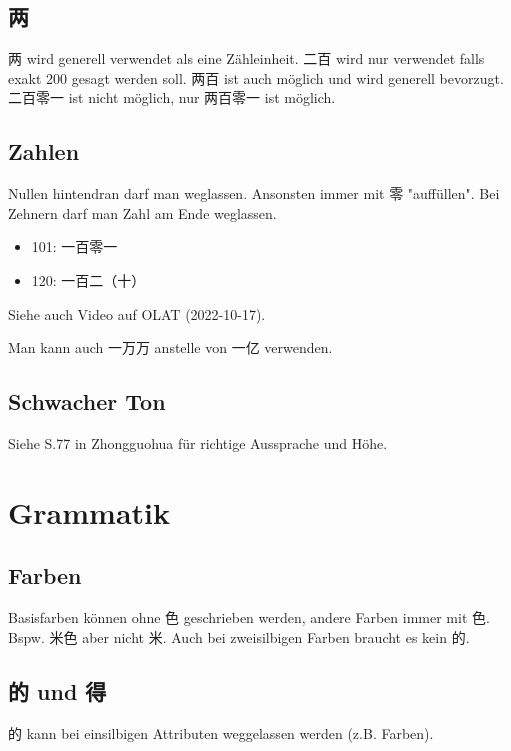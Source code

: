 \documentclass[UTF8]{ctexart}
\begin{document}
\subsection{两}

两 wird generell verwendet als eine Zähleinheit. 二百 wird nur verwendet falls exakt 200 gesagt werden soll. 两百 ist auch möglich und wird generell bevorzugt. 二百零一 ist nicht möglich, nur 两百零一 ist möglich.

\subsection{Zahlen}

Nullen hintendran darf man weglassen. Ansonsten immer mit 零 "auffüllen". Bei Zehnern darf man Zahl am Ende weglassen.

\begin{itemize}
    \item 101: 一百零一
    \item 120: 一百二（十）
\end{itemize}

Siehe auch Video auf OLAT (2022-10-17).

Man kann auch 一万万 anstelle von 一亿 verwenden.


\subsection{Schwacher Ton}

Siehe S.77 in Zhongguohua für richtige Aussprache und Höhe.

\section{Grammatik}

\subsection{Farben}

Basisfarben können ohne 色 geschrieben werden, andere Farben immer mit 色. Bspw. 米色 aber nicht 米. Auch bei zweisilbigen Farben braucht es kein 的.

\subsection{的 und 得}

的 kann bei einsilbigen Attributen weggelassen werden (z.B. Farben).
\end{document}
